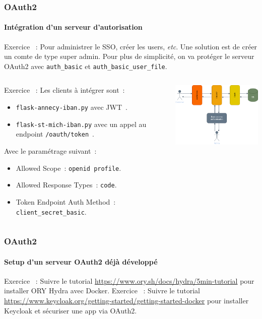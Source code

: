 \documentclass{beamer}
\begin{document}
    \begin{frame}
        \frametitle{OAuth2}
        \framesubtitle{Intégration d'un serveur d'autorisation}
        \transdissolve
        Exercice \execcounterdispinc{}~:
        Pour administrer le SSO, créer les users, \textit{etc}.
        Une solution est de créer un comte de type super admin.
        Pour plus de simplicité, on va protéger le serveur OAuth2 avec \lstinline{auth_basic} et \lstinline{auth_basic_user_file}.
        \begin{columns}
            \begin{column}{0.6\textwidth}
                Exercice \execcounterdispinc{}~:
                Les clients à intégrer sont~:
                \begin{itemize}
                    \item \lstinline{flask-annecy-iban.py} avec JWT~.
                    \item \lstinline{flask-st-mich-iban.py} avec un appel au endpoint \lstinline{/oauth/token}~.
                \end{itemize}
                Avec le paramétrage suivant~:
                \begin{itemize}
                    \item Allowed Scope~: \lstinline{openid profile}.
                    \item Allowed Response Types~: \lstinline{code}.
                    \item Token Endpoint Auth Method~: \lstinline{client_secret_basic}.
                \end{itemize}
            \end{column}
            \begin{column}{0.4\textwidth}
                \centering
                \includegraphics[width=6cm]{image/OAuth2-integration.drawio}
            \end{column}
        \end{columns}
    \end{frame}

    \begin{frame}
        \frametitle{OAuth2}
        \framesubtitle{Setup d'un serveur OAuth2 déjà développé}
        \transdissolve
        Exercice \execcounterdispinc{}~:
        Suivre le tutorial \url{https://www.ory.sh/docs/hydra/5min-tutorial} pour installer ORY Hydra avec Docker.
        \bigbreak
        Exercice \execcounterdispinc{}~:
        Suivre le tutorial \url{https://www.keycloak.org/getting-started/getting-started-docker} pour installer Keycloak et sécuriser une app via OAuth2.
    \end{frame}
\end{document}
